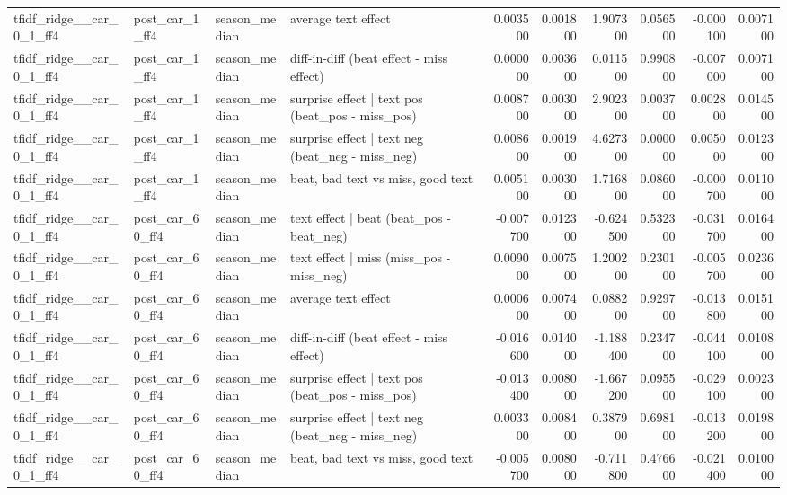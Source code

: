 \begin{table}
\begin{tabular}{llllrrrrrr}
tfidf\_ridge\_\_car\_0\_1\_ff4 & post\_car\_1\_ff4 & season\_median & average text effect & 0.003500 & 0.001800 & 1.907300 & 0.056500 & -0.000100 & 0.007100 \\
tfidf\_ridge\_\_car\_0\_1\_ff4 & post\_car\_1\_ff4 & season\_median & diff-in-diff (beat effect - miss effect) & 0.000000 & 0.003600 & 0.011500 & 0.990800 & -0.007000 & 0.007100 \\
tfidf\_ridge\_\_car\_0\_1\_ff4 & post\_car\_1\_ff4 & season\_median & surprise effect | text pos (beat\_pos - miss\_pos) & 0.008700 & 0.003000 & 2.902300 & 0.003700 & 0.002800 & 0.014500 \\
tfidf\_ridge\_\_car\_0\_1\_ff4 & post\_car\_1\_ff4 & season\_median & surprise effect | text neg (beat\_neg - miss\_neg) & 0.008600 & 0.001900 & 4.627300 & 0.000000 & 0.005000 & 0.012300 \\
tfidf\_ridge\_\_car\_0\_1\_ff4 & post\_car\_1\_ff4 & season\_median & beat, bad text vs miss, good text & 0.005100 & 0.003000 & 1.716800 & 0.086000 & -0.000700 & 0.011000 \\
tfidf\_ridge\_\_car\_0\_1\_ff4 & post\_car\_60\_ff4 & season\_median & text effect | beat  (beat\_pos - beat\_neg) & -0.007700 & 0.012300 & -0.624500 & 0.532300 & -0.031700 & 0.016400 \\
tfidf\_ridge\_\_car\_0\_1\_ff4 & post\_car\_60\_ff4 & season\_median & text effect | miss  (miss\_pos - miss\_neg) & 0.009000 & 0.007500 & 1.200200 & 0.230100 & -0.005700 & 0.023600 \\
tfidf\_ridge\_\_car\_0\_1\_ff4 & post\_car\_60\_ff4 & season\_median & average text effect & 0.000600 & 0.007400 & 0.088200 & 0.929700 & -0.013800 & 0.015100 \\
tfidf\_ridge\_\_car\_0\_1\_ff4 & post\_car\_60\_ff4 & season\_median & diff-in-diff (beat effect - miss effect) & -0.016600 & 0.014000 & -1.188400 & 0.234700 & -0.044100 & 0.010800 \\
tfidf\_ridge\_\_car\_0\_1\_ff4 & post\_car\_60\_ff4 & season\_median & surprise effect | text pos (beat\_pos - miss\_pos) & -0.013400 & 0.008000 & -1.667200 & 0.095500 & -0.029100 & 0.002300 \\
tfidf\_ridge\_\_car\_0\_1\_ff4 & post\_car\_60\_ff4 & season\_median & surprise effect | text neg (beat\_neg - miss\_neg) & 0.003300 & 0.008400 & 0.387900 & 0.698100 & -0.013200 & 0.019800 \\
tfidf\_ridge\_\_car\_0\_1\_ff4 & post\_car\_60\_ff4 & season\_median & beat, bad text vs miss, good text & -0.005700 & 0.008000 & -0.711800 & 0.476600 & -0.021400 & 0.010000 \\

\end{tabular}
\end{table}
